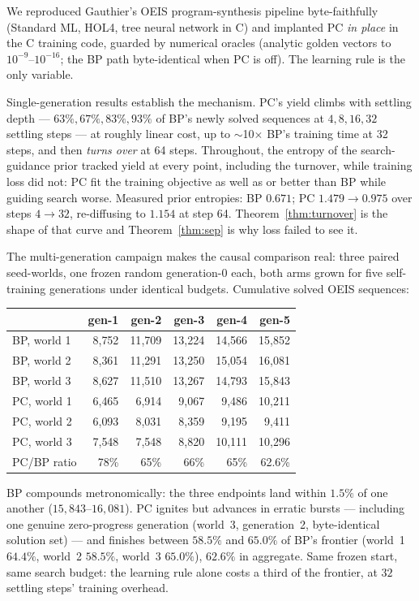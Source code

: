 \documentclass[11pt]{article}
\begin{document}
We reproduced Gauthier's OEIS program-synthesis pipeline byte-faithfully (Standard ML,
HOL4, tree neural network in C) and implanted PC \emph{in place} in the C training code,
guarded by numerical oracles (analytic golden vectors to $10^{-9}$--$10^{-16}$; the BP
path byte-identical when PC is off). The learning rule is the only variable.

Single-generation results establish the mechanism. PC's yield climbs with settling depth
--- $63\%, 67\%, 83\%, 93\%$ of BP's newly solved sequences at $4, 8, 16, 32$ settling
steps --- at roughly linear cost, up to $\sim$10$\times$ BP's training time at 32 steps,
and then \emph{turns over} at 64 steps. Throughout, the entropy of the search-guidance
prior tracked yield at every point, including the turnover, while training loss did not:
PC fit the training objective as well as or better than BP while guiding search worse.
Measured prior entropies: BP $0.671$; PC $1.479 \to 0.975$ over steps $4 \to 32$,
re-diffusing to $1.154$ at step 64. Theorem~\ref{thm:turnover} is the shape of that
curve and Theorem~\ref{thm:sep} is why loss failed to see it.

The multi-generation campaign makes the causal comparison real: three paired seed-worlds,
one frozen random generation-0 each, both arms grown for five self-training generations
under identical budgets. Cumulative solved OEIS sequences:

\begin{center}
\begin{tabular}{lrrrrr}
\toprule
 & gen-1 & gen-2 & gen-3 & gen-4 & gen-5 \\
\midrule
BP, world 1 & 8{,}752 & 11{,}709 & 13{,}224 & 14{,}566 & 15{,}852 \\
BP, world 2 & 8{,}361 & 11{,}291 & 13{,}250 & 15{,}054 & 16{,}081 \\
BP, world 3 & 8{,}627 & 11{,}510 & 13{,}267 & 14{,}793 & 15{,}843 \\
PC, world 1 & 6{,}465 & 6{,}914 & 9{,}067 & 9{,}486 & 10{,}211 \\
PC, world 2 & 6{,}093 & 8{,}031 & 8{,}359 & 9{,}195 & 9{,}411 \\
PC, world 3 & 7{,}548 & 7{,}548 & 8{,}820 & 10{,}111 & 10{,}296 \\
\midrule
PC/BP ratio & 78\% & 65\% & 66\% & 65\% & 62.6\% \\
\bottomrule
\end{tabular}
\end{center}

BP compounds metronomically: the three endpoints land within $1.5\%$ of one another
($15{,}843$--$16{,}081$). PC ignites but advances in erratic bursts
--- including one genuine zero-progress generation (world~3, generation~2, byte-identical
solution set) --- and finishes between $58.5\%$ and $65.0\%$ of BP's frontier (world~1
$64.4\%$, world~2 $58.5\%$, world~3 $65.0\%$), $62.6\%$ in aggregate. Same frozen start,
same search budget: the learning rule alone costs a third of the frontier, at
$32$ settling steps' training overhead.
\end{document}
